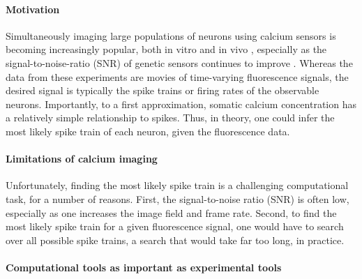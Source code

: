 \paragraph{Motivation}

Simultaneously imaging large populations of neurons using calcium sensors is becoming increasingly popular, both in vitro  \cite{ImagingManual} and in vivo \cite{NagayamaChen07, GobelHelmchen07, LuoSvoboda08}, especially as the signal-to-noise-ratio (SNR) of genetic sensors continues to improve \cite{GaraschukKonnerth07, MankGriesbeck08, WallaceHasan08}. Whereas the data from these experiments are movies of time-varying fluorescence signals, the desired signal is typically the spike trains or firing rates of the observable neurons.  Importantly, to a first approximation, somatic calcium concentration has a relatively simple relationship to spikes.  Thus, in theory, one could infer the most likely spike train of each neuron, given the fluorescence data.  

\paragraph{Limitations of calcium imaging}

Unfortunately, finding the most likely spike train is a challenging computational task, for a number of reasons.  First, the signal-to-noise ratio (SNR) is often low, especially as one increases the image field and frame rate.  Second, to find the most likely spike train for a given fluorescence signal, one would have to search over all possible spike trains, a search that would take far too long, in practice.  

\paragraph{Computational tools as important as experimental tools}

